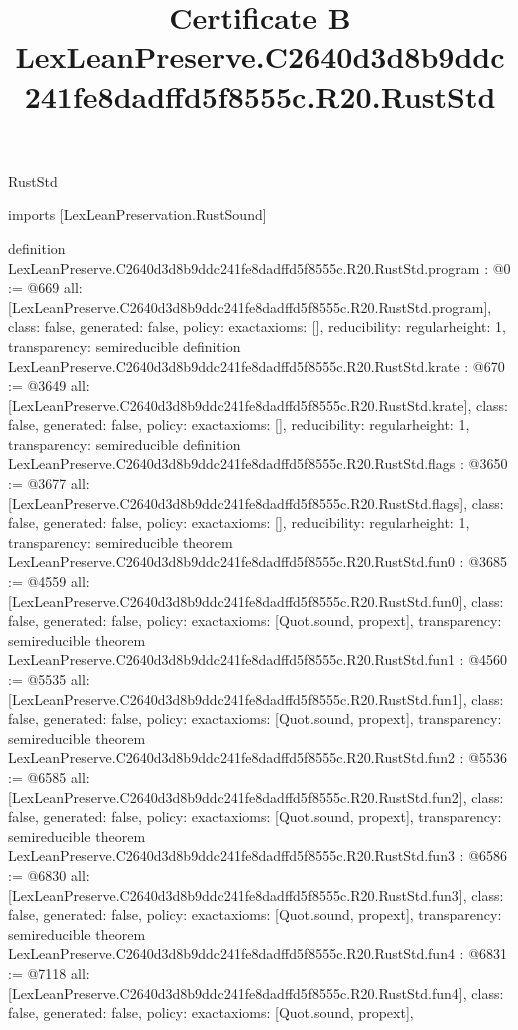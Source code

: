 \begin{lexlean}{RustStd}
\title{Certificate B LexLeanPreserve.C2640d3d8b9ddc241fe8dadffd5f8555c.R20.RustStd}
\begin{coremodule}
imports [LexLeanPreservation.RustSound]

definition LexLeanPreserve.C2640d3d8b9ddc241fe8dadffd5f8555c.R20.RustStd.program : @0 := @669 {
  all: [LexLeanPreserve.C2640d3d8b9ddc241fe8dadffd5f8555c.R20.RustStd.program],
  class: false,
  generated: false,
  policy: exact{axioms: []},
  reducibility: regular{height: 1},
  transparency: semireducible
}
definition LexLeanPreserve.C2640d3d8b9ddc241fe8dadffd5f8555c.R20.RustStd.krate : @670 := @3649 {
  all: [LexLeanPreserve.C2640d3d8b9ddc241fe8dadffd5f8555c.R20.RustStd.krate],
  class: false,
  generated: false,
  policy: exact{axioms: []},
  reducibility: regular{height: 1},
  transparency: semireducible
}
definition LexLeanPreserve.C2640d3d8b9ddc241fe8dadffd5f8555c.R20.RustStd.flags : @3650 := @3677 {
  all: [LexLeanPreserve.C2640d3d8b9ddc241fe8dadffd5f8555c.R20.RustStd.flags],
  class: false,
  generated: false,
  policy: exact{axioms: []},
  reducibility: regular{height: 1},
  transparency: semireducible
}
theorem LexLeanPreserve.C2640d3d8b9ddc241fe8dadffd5f8555c.R20.RustStd.fun0 : @3685 := @4559 {
  all: [LexLeanPreserve.C2640d3d8b9ddc241fe8dadffd5f8555c.R20.RustStd.fun0],
  class: false,
  generated: false,
  policy: exact{axioms: [Quot.sound, propext]},
  transparency: semireducible
}
theorem LexLeanPreserve.C2640d3d8b9ddc241fe8dadffd5f8555c.R20.RustStd.fun1 : @4560 := @5535 {
  all: [LexLeanPreserve.C2640d3d8b9ddc241fe8dadffd5f8555c.R20.RustStd.fun1],
  class: false,
  generated: false,
  policy: exact{axioms: [Quot.sound, propext]},
  transparency: semireducible
}
theorem LexLeanPreserve.C2640d3d8b9ddc241fe8dadffd5f8555c.R20.RustStd.fun2 : @5536 := @6585 {
  all: [LexLeanPreserve.C2640d3d8b9ddc241fe8dadffd5f8555c.R20.RustStd.fun2],
  class: false,
  generated: false,
  policy: exact{axioms: [Quot.sound, propext]},
  transparency: semireducible
}
theorem LexLeanPreserve.C2640d3d8b9ddc241fe8dadffd5f8555c.R20.RustStd.fun3 : @6586 := @6830 {
  all: [LexLeanPreserve.C2640d3d8b9ddc241fe8dadffd5f8555c.R20.RustStd.fun3],
  class: false,
  generated: false,
  policy: exact{axioms: [Quot.sound, propext]},
  transparency: semireducible
}
theorem LexLeanPreserve.C2640d3d8b9ddc241fe8dadffd5f8555c.R20.RustStd.fun4 : @6831 := @7118 {
  all: [LexLeanPreserve.C2640d3d8b9ddc241fe8dadffd5f8555c.R20.RustStd.fun4],
  class: false,
  generated: false,
  policy: exact{axioms: [Quot.sound, propext]},
}
\end{coremodule}
\end{lexlean}
